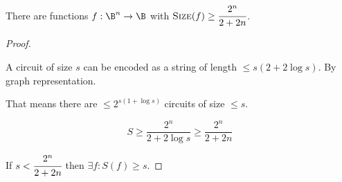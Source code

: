 \begin{theorem}[Shannon]
  There are functions
  \(f: \B^n \rightarrow \B\) with
  \(\text{\textsc{Size}}(f) \ge \cfrac{2^n}{2+2n}\).
\end{theorem}
\begin{proof}

\begin{lemma}
A circuit of size $s$ can be encoded as a string of length
\(\le s(2 + 2 \log s )\). By graph representation.
\end{lemma}

\begin{remark}
That means there are \(\le 2^{s(1+\log s)}\) circuits of size
\(\le s\).
\end{remark}

$$S \ge \frac{2^n}{2 + 2\log s} \ge \frac{2^n}{2+2n}$$

If \(s < \cfrac{2^n}{2+2n}\) then \(\exists f: S(f) \ge s\).

\end{proof}
